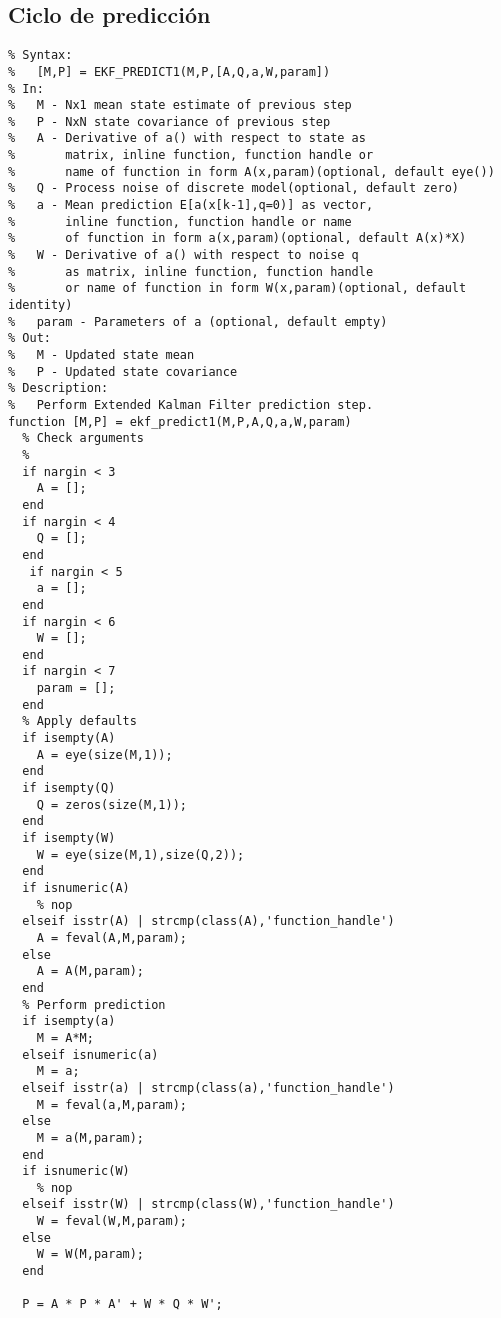 \subsection{Ciclo de predicción}
\lstset{language=Matlab, breaklines=true, basicstyle=\footnotesize}
\lstset{numbers=left, numberstyle=\tiny, stepnumber=1, numbersep=-2pt}
\begin{lstlisting}[frame=single]
 %EKF_PREDICT1  1st order Extended Kalman Filter prediction step
% Syntax:
%   [M,P] = EKF_PREDICT1(M,P,[A,Q,a,W,param])
% In:
%   M - Nx1 mean state estimate of previous step
%   P - NxN state covariance of previous step
%   A - Derivative of a() with respect to state as
%       matrix, inline function, function handle or
%       name of function in form A(x,param)(optional, default eye())
%   Q - Process noise of discrete model(optional, default zero)
%   a - Mean prediction E[a(x[k-1],q=0)] as vector,
%       inline function, function handle or name
%       of function in form a(x,param)(optional, default A(x)*X)
%   W - Derivative of a() with respect to noise q
%       as matrix, inline function, function handle
%       or name of function in form W(x,param)(optional, default identity)
%   param - Parameters of a (optional, default empty)
% Out:
%   M - Updated state mean
%   P - Updated state covariance
% Description:
%   Perform Extended Kalman Filter prediction step.
function [M,P] = ekf_predict1(M,P,A,Q,a,W,param)
  % Check arguments
  %
  if nargin < 3
    A = [];
  end
  if nargin < 4
    Q = [];
  end
   if nargin < 5
    a = [];
  end
  if nargin < 6
    W = [];
  end
  if nargin < 7
    param = [];
  end
  % Apply defaults
  if isempty(A)
    A = eye(size(M,1));
  end
  if isempty(Q)
    Q = zeros(size(M,1));
  end
  if isempty(W)
    W = eye(size(M,1),size(Q,2));
  end
  if isnumeric(A)
    % nop
  elseif isstr(A) | strcmp(class(A),'function_handle')
    A = feval(A,M,param);
  else
    A = A(M,param);
  end
  % Perform prediction
  if isempty(a)
    M = A*M;
  elseif isnumeric(a)
    M = a;
  elseif isstr(a) | strcmp(class(a),'function_handle')
    M = feval(a,M,param);
  else
    M = a(M,param);
  end
  if isnumeric(W)
    % nop
  elseif isstr(W) | strcmp(class(W),'function_handle')
    W = feval(W,M,param);
  else
    W = W(M,param);
  end

  P = A * P * A' + W * Q * W';
\end{lstlisting}
